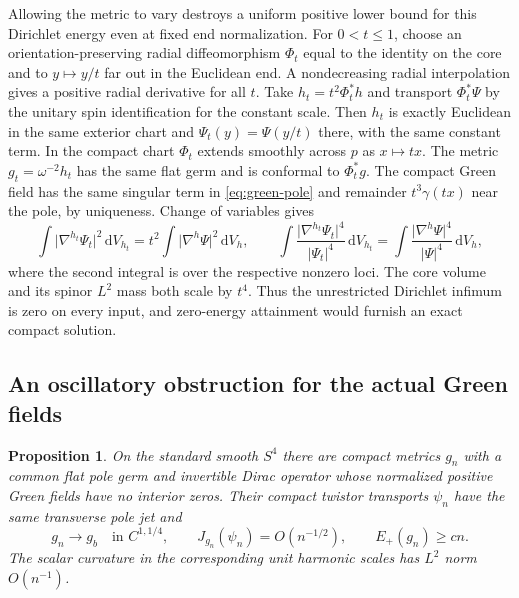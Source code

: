 \documentclass[11pt]{article}
\numberwithin{equation}{section}
\newtheorem{proposition}[theorem]{Proposition}
\newcommand{\dd}{\mathrm{d}}
\newcommand{\Sphere}{S^4}
\newcommand{\abs}[1]{\lvert #1\rvert}
\begin{document}
Allowing the metric to vary destroys a uniform positive lower bound
for this Dirichlet energy even at fixed end normalization. For
\(0<t\le1\), choose an orientation-preserving radial diffeomorphism
\(\Phi_t\) equal to the identity on the core and to \(y\mapsto y/t\)
far out in the Euclidean end. A nondecreasing radial interpolation
gives a positive radial derivative for all \(t\). Take
\(h_t=t^2\Phi_t^*h\) and transport \(\Phi_t^*\Psi\) by the unitary
spin identification for the constant scale. Then \(h_t\) is exactly
Euclidean in the same exterior chart and
\(\Psi_t(y)=\Psi(y/t)\) there, with the same constant term. In the
compact chart \(\Phi_t\) extends smoothly across \(p\) as \(x\mapsto tx\).
The metric \(g_t=\omega^{-2}h_t\) has the same flat germ and is
conformal to \(\Phi_t^*g\). The compact Green field has the same
singular term in \eqref{eq:green-pole} and remainder \(t^3\gamma(tx)\)
near the pole, by uniqueness. Change of variables gives
\[
 \int\abs{\nabla^{h_t}\Psi_t}^2\,\dd V_{h_t}
   =t^2\int\abs{\nabla^h\Psi}^2\,\dd V_h,\qquad
 \int \frac{\abs{\nabla^{h_t}\Psi_t}^4}{\abs{\Psi_t}^4}\,\dd V_{h_t}
   =\int \frac{\abs{\nabla^h\Psi}^4}{\abs{\Psi}^4}\,\dd V_h ,
\]
where the second integral is over the respective nonzero loci.
The core volume and its spinor \(L^2\) mass both scale by \(t^4\).
Thus the unrestricted Dirichlet infimum is zero on every input,
and zero-energy attainment would furnish an exact compact solution.

\subsection{An oscillatory obstruction for the actual Green fields}

\begin{proposition}\label{prop:oscillation}
On the standard smooth \(\Sphere\) there are compact metrics \(g_n\)
with a common flat pole germ and invertible Dirac operator whose
normalized positive Green fields have no interior zeros. Their compact
twistor transports \(\psi_n\) have the same transverse pole jet and
\[
 g_n\longrightarrow g_b\quad\text{in }C^{1,1/4},\qquad
 J_{g_n}(\psi_n)=O(n^{-1/2}),\qquad E_+(g_n)\ge c n .
\]
The scalar curvature in the corresponding unit harmonic scales
has \(L^2\) norm \(O(n^{-1})\).
\end{proposition}
\end{document}
